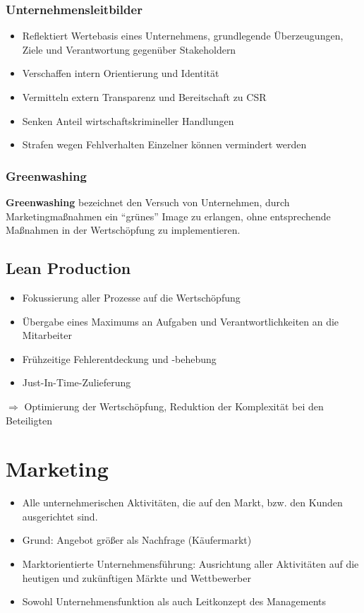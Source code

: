 \documentclass[titlepage,parskip=half]{scrartcl}
\let\Section\section
\renewcommand\section{\clearpage\Section}
\begin{document}
\subsubsection{Unternehmensleitbilder}
\begin{itemize}
    \item Reflektiert Wertebasis eines Unternehmens, grundlegende Überzeugungen, Ziele und Verantwortung gegenüber Stakeholdern
    \item Verschaffen intern Orientierung und Identität
    \item Vermitteln extern Transparenz und Bereitschaft zu CSR
    \item Senken Anteil wirtschaftskrimineller Handlungen
    \item Strafen wegen Fehlverhalten Einzelner können vermindert werden
\end{itemize}

\subsubsection{Greenwashing}
\textbf{Greenwashing} bezeichnet den Versuch von Unternehmen, durch Marketingmaßnahmen ein \enquote{grünes} Image zu erlangen, ohne entsprechende Maßnahmen in der Wertschöpfung zu implementieren.

\subsection{Lean Production}
\begin{itemize}
    \item Fokussierung aller Prozesse auf die Wertschöpfung
    \item Übergabe eines Maximums an Aufgaben und Verantwortlichkeiten an die Mitarbeiter
    \item Frühzeitige Fehlerentdeckung und -behebung
    \item Just-In-Time-Zulieferung
\end{itemize}
$\Rightarrow$ Optimierung der Wertschöpfung, Reduktion der Komplexität bei den Beteiligten


\section{Marketing}
\begin{itemize}
    \item Alle unternehmerischen Aktivitäten, die auf den Markt, bzw. den Kunden ausgerichtet sind.
    \item Grund: Angebot größer als Nachfrage (Käufermarkt)
    \item Marktorientierte Unternehmensführung: Ausrichtung aller Aktivitäten auf die heutigen und zukünftigen Märkte und Wettbewerber
    \item Sowohl Unternehmensfunktion als auch Leitkonzept des Managements
\end{itemize}
\end{document}
